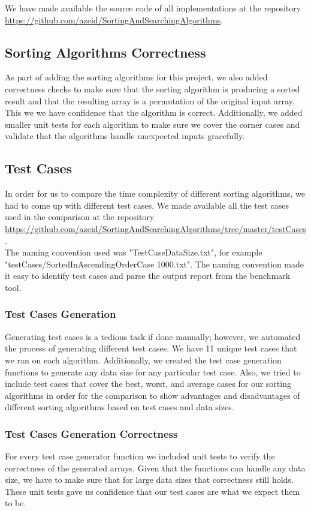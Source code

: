 We have made available the source code of all implementations at the repository \url{https://github.com/azeid/SortingAndSearchingAlgorithms}.

\subsection{Sorting Algorithms Correctness}
As part of adding the sorting algorithms for this project, we also added correctness checks to make sure that the sorting algorithm is producing a sorted result and that the resulting array is a permutation of the original input array. This we we have confidence that the algorithm is correct. Additionally, we added smaller unit tests for each algorithm to make sure we cover the corner cases and validate that the algorithms handle unexpected inputs gracefully.

\subsection{Test Cases}
In order for us to compare the time complexity of different sorting algorithms, we had to come up with different test cases. We made available all the test cases used in the comparison at the repository \url{https://github.com/azeid/SortingAndSearchingAlgorithms/tree/master/testCases}.\\
The naming convention used was "TestCase\textunderscore DataSize.txt", for example "testCases/SortedInAscendingOrderCase \textunderscore 1000.txt". The naming convention made it easy to identify test cases and parse the output report from the benchmark tool.

\subsubsection{Test Cases Generation}
Generating test cases is a tedious task if done manually; however, we automated the process of generating different test cases. We have 11 unique test cases that we ran on each algorithm. Additionally, we created the test case generation functions to generate any data size for any particular test case. Also, we tried to include test cases that cover the best, worst, and average cases for our sorting algorithms in order for the comparison to show advantages and disadvantages of different sorting algorithms based on test cases and data sizes.

\subsubsection{Test Cases Generation Correctness}
For every test case generator function we included unit tests to verify the correctness of the generated arrays. Given that the functions can handle any data size, we have to make sure that for large data sizes that correctness still holds. These unit tests gave us confidence that our test cases are what we expect them to be.

